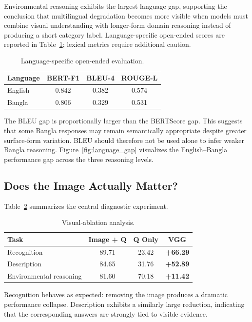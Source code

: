 \documentclass{article}
\begin{document}
Environmental reasoning exhibits the largest language gap, supporting the conclusion that multilingual degradation becomes more visible when models must combine visual understanding with longer-form domain reasoning instead of producing a short category label. Language-specific open-ended scores are reported in Table~\ref{tab:language_generation_metrics}; lexical metrics require additional caution.

\begin{table}[t]
\centering
\caption{Language-specific open-ended evaluation. }
\label{tab:language_generation_metrics}
\begin{tabular}{lccc}
\toprule
\textbf{Language}
& \textbf{BERT-F1}
& \textbf{BLEU-4}
& \textbf{ROUGE-L} \\
\midrule
English
& 0.842
& 0.382
& 0.574 \\

Bangla
& 0.806
& 0.329
& 0.531 \\
\bottomrule
\end{tabular}
\end{table}

The BLEU gap is proportionally larger than the BERTScore gap. This suggests that some Bangla responses may remain semantically appropriate despite greater surface-form variation. BLEU should therefore not be used alone to infer weaker Bangla reasoning. Figure~\ref{fig:language_gap} visualizes the English--Bangla performance gap across the three reasoning levels.




\subsection{Does the Image Actually Matter?}
\label{subsec:image_ablation_results}
Table~\ref{tab:visual_ablation} summarizes the central diagnostic experiment.
\begin{table}[t]
\centering
\caption{Visual-ablation analysis. }
\label{tab:visual_ablation}
\begin{tabular}{lccc}
\toprule
\textbf{Task}
&
\textbf{Image + Q}
&
\textbf{Q Only}
&
\textbf{VGG} \\
\midrule
Recognition
& 89.71
& 23.42
& \textbf{+66.29} \\

Description
& 84.65
& 31.76
& \textbf{+52.89} \\

Environmental reasoning
& 81.60
& 70.18
& \textbf{+11.42} \\
\bottomrule
\end{tabular}
\end{table}
Recognition behaves as expected: removing the image produces a dramatic performance collapse. Description exhibits a similarly large reduction, indicating that the corresponding answers are strongly tied to visible evidence.
\end{document}
